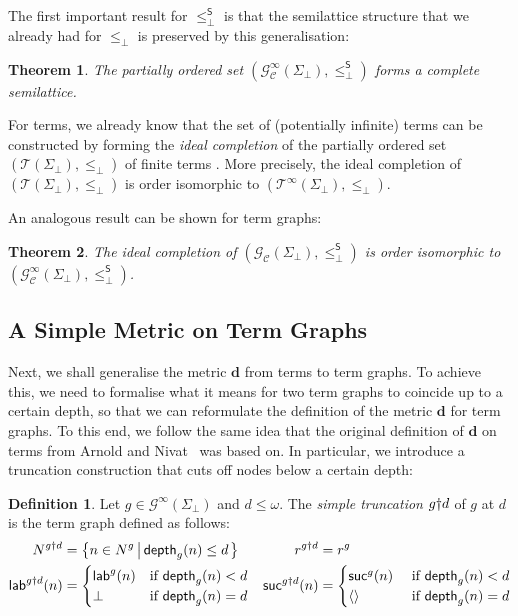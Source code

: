 \documentclass[copyright,creativecommons,UKenglish,final]{eptcs}
\newcommand\lebot{\le_\bot}
\newcommand\lebots{\lebot^\textsf{S}}
\newcommand\dd{\mathbf{d}}
\newcommand\calC{\mathcal{C}}
\newcommand\calG{\mathcal{G}}
\newcommand\calT{\mathcal{T}}
\newcommand\seq[1]{\langle #1 \rangle}
\newcommand\emptyseq{\seq{}}
\newcommand{\setcom}[2]{\set{#1\left\vert\vphantom{#1}\,#2\right.}}
\newcommand{\set}[1]{\left\{#1\right\}}
\newcommand\depth[2]{\symb{depth}_{#1}(#2)}
\newcommand\iptgraphs[1][\Sigma]{\calG^\infty(#1_\bot)}
\newcommand\pctgraphs[1][\Sigma]{\calG_\calC(#1_\bot)}
\newcommand\ipctgraphs[1][\Sigma]{\calG^\infty_\calC(#1_\bot)}
\newcommand\pterms[1][\Sigma]{\calT(#1_\bot)}
\newcommand\ipterms[1][\Sigma]{\calT^\infty(#1_\bot)}
\newcommand\symb[1]{\mathsf{#1}}
\newcommand\glab{\symb{lab}}
\newcommand\gsuc{\symb{suc}}
\theoremstyle{definition}
\newtheorem{definition}{Definition}[section]
\theoremstyle{plain}
\newtheorem{theorem}{Theorem}[section]
\begin{document}
The first important result for $\lebots$ is that the semilattice
structure that we already had for $\lebot$ is preserved by this
generalisation:
\begin{theorem}
  \label{thr:complSemilattice}
  The partially ordered set $(\ipctgraphs,\lebots)$ forms a complete
  semilattice.
\end{theorem}

For terms, we already know that the set of (potentially infinite)
terms can be constructed by forming the \emph{ideal completion} of the
partially ordered set $(\pterms,\lebot)$ of finite terms
\cite{berry77popl}. More precisely, the ideal completion of
$(\pterms,\lebot)$ is order isomorphic to $(\ipterms,\lebot)$.

An analogous result can be shown for term graphs:
\begin{theorem}\label{thr:idealCompletion}
  The ideal completion of $(\pctgraphs, \lebots)$ is order isomorphic
  to $(\ipctgraphs,\lebots)$.
\end{theorem}


\subsection{A Simple Metric on Term Graphs}
\label{sec:simple-metric-term}

Next, we shall generalise the metric $\dd$ from terms to term
graphs. To achieve this, we need to formalise what it means for two
term graphs to coincide up to a certain depth, so that we can
reformulate the definition of the metric $\dd$ for term graphs. To
this end, we follow the same idea that the original definition of
$\dd$ on terms from Arnold and Nivat~\cite{arnold80fi} was based
on. In particular, we introduce a truncation construction that cuts
off nodes below a certain depth:
\begin{definition}\label{def:trunca}
  Let $g \in \iptgraphs$ and $d \le \omega$. The \emph{simple
    truncation} $g\mathclose{\dagger}d$ of $g$ at $d$ is the term graph
  defined as follows:
  \begin{align*}
    N^{\truncs{g}{d}} &= \setcom{n \in N^g}{\depth{g}{n} \le d}
    & r^{\truncs{g}{d}} &= r^g
    \\
    \glab^{\truncs{g}{d}}(n) &= 
    \begin{cases}
      \glab^g(n) &\text{if } \depth{g}{n} < d \\
      \bot  &\text{if } \depth{g}{n} = d
    \end{cases} &
    \gsuc^{\truncs{g}{d}}(n) &=
    \begin{cases}
      \gsuc^g(n) &\text{ if }\depth{g}{n} < d\\
      \emptyseq &\text{ if }\depth{g}{n} = d
    \end{cases}
  \end{align*}
\end{definition}
\end{document}
